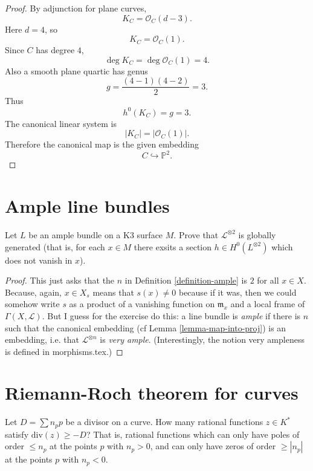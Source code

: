 \begin{proof}
By adjunction for plane curves,
$$
  K_C=\mathcal O_C(d-3).
$$
Here $d=4$, so
$$
  K_C=\mathcal O_C(1).
$$
Since $C$ has degree $4$,
$$
  \deg K_C
  =
  \deg \mathcal O_C(1)
  =
  4.
$$
Also a smooth plane quartic has genus
$$
  g=\frac{(4-1)(4-2)}2=3.
$$
Thus
$$
  h^0(K_C)=g=3.
$$
The canonical linear system is
$$
  |K_C|=|\mathcal O_C(1)|.
$$
Therefore the canonical map is the given
embedding
$$
  C\hookrightarrow \mathbb P^2.
$$
\end{proof}

\section{Ample line bundles}
\label{section-ample-line-bundles}


\begin{exercise}
\label{exercise-ample-bundle-on-K3}
Let $L$ be an ample bundle on a K3 surface
$M$. Prove that
$\mathcal{L}^{\otimes 2}$ is globally
generated (that is, for each $x\in M$
there exsits a section $h \in
H^{0}(L^{\otimes 2})$ which does not vanish
in
$x$).
\end{exercise}

\begin{proof}
This just asks that the $n$ in Definition
\ref{definition-ample} is $2$ for all
$x\in X$. Because, again, $x\in X_s$ means
that $s(x)\neq 0$ because if it was,
then we could somehow write $s$ as a product
of a vanishing function on
$\mathfrak{m}_x$ and a local frame of
$\Gamma(X,\mathcal{L})$. But I guess for
the exercise do this: a line bundle is {\it
ample} if there is $n$ such that the
canonical embedding (cf Lemma
\ref{lemma-map-into-proj}) is an embedding,
i.e.
that $\mathcal{L}^{\otimes n}$ is {\it very
ample}. (Interestingly, the notion
very ampleness is defined in morphisms.tex.)
\end{proof}


\section{Riemann-Roch theorem for curves}
\label{section-riemann-roch}

\noindent
Let $D=\sum n_p p$ be a divisor on a curve.
How many rational functions $z \in K^*$
satisfy
$\text{div}(z) \geq -D$? That is, rational
functions
which can only have poles of order $\leq n_p$
at the points $p$ with $n_p>0$,
and can only have zeros of order $\geq
|n_p|$
at the points $p$ with $n_p<0$.

